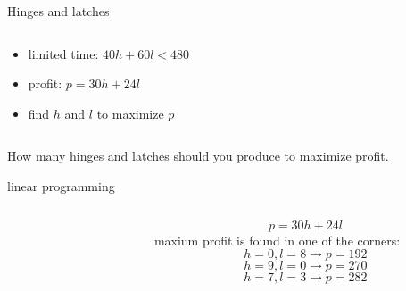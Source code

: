 \begin{frame}{Hinges and latches}
\begin{columns}
\begin{column}{0.5\linewidth}
\begin{itemize}
\pause\item limited time: $40h + 60l < 480$

\pause \item profit: $p = 30h + 24l$

\pause \item find $h$ and $l$ to maximize $p$
  \end{itemize}
 \end{column}
\end{columns}
\pause \vspace{20pt}

How many hinges and latches should you produce to maximize profit. 

\end{frame}


\begin{frame}{linear programming}

\begin{columns}
 \begin{column}{0.5\linewidth}
\begin{figure}
\end{figure}
 \end{column} 
 \begin{column}{0.5\linewidth}
  $$ p = 30h + 24l$$ 
  \pause
  maxium profit is found in one of the corners: \pause
  $$ h = 0, l = 8 \rightarrow  p = 192$$ \pause
  $$ h = 9, l = 0  \rightarrow  p = 270$$  \pause
  $$ h = 7, l = 3 \rightarrow p =  282$$ \pause
 \end{column}
 \end{columns}
\end{frame}

